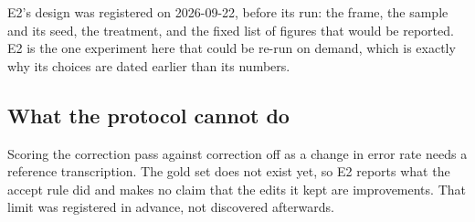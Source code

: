E2's design was registered on 2026-09-22, before its run: the frame, the
sample and its seed, the treatment, and the fixed list of figures that would
be reported. E2 is the one experiment here that could be re-run on demand, which
is exactly why its choices are dated earlier than its numbers.

\subsection{What the protocol cannot do}

Scoring the correction pass against correction off as a change in error rate
needs a reference transcription. The gold set does not exist yet, so E2 reports
what the accept rule did and makes no claim that the edits it kept are
improvements. That limit was registered in advance, not discovered afterwards.
